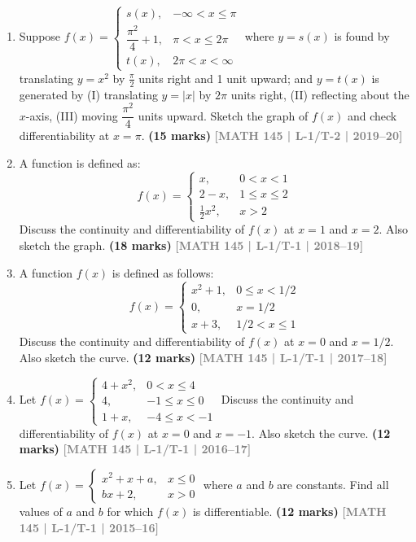 \documentclass[12pt,a4paper]{article}
\newcommand{\yr}[1]{\hfill\textcolor{gray}{\small\textbf{[#1]}}}
\newcommand{\mk}[1]{\textcolor{orange!70!black}{\small\textbf{(#1 marks)}}}
\begin{document}
\begin{enumerate}
\item Suppose $f(x)=\begin{cases}s(x), & -\infty<x\le\pi\\ \dfrac{\pi^{2}}{4}+1, & \pi<x\le 2\pi\\ t(x), & 2\pi<x<\infty\end{cases}$ where $y=s(x)$ is found by translating $y=x^{2}$ by $\frac{\pi}{2}$ units right and 1 unit upward; and $y=t(x)$ is generated by (I) translating $y=|x|$ by $2\pi$ units right, (II) reflecting about the $x$-axis, (III) moving $\dfrac{\pi^{2}}{4}$ units upward. Sketch the graph of $f(x)$ and check differentiability at $x=\pi$.
\mk{15} \yr{MATH 145 | L-1/T-2 | 2019--20}

\item A function is defined as:
\[
f(x)=\begin{cases}x, & 0<x<1\\ 2-x, & 1\le x\le 2\\ \tfrac{1}{2}x^{2}, & x>2\end{cases}
\]
Discuss the continuity and differentiability of $f(x)$ at $x=1$ and $x=2$. Also sketch the graph.
\mk{18} \yr{MATH 145 | L-1/T-1 | 2018--19}

\item A function $f(x)$ is defined as follows:
\[
f(x)=\begin{cases}x^{2}+1, & 0\le x<1/2\\ 0, & x=1/2\\ x+3, & 1/2<x\le 1\end{cases}
\]
Discuss the continuity and differentiability of $f(x)$ at $x=0$ and $x=1/2$. Also sketch the curve.
\mk{12} \yr{MATH 145 | L-1/T-1 | 2017--18}

\item Let $f(x)=\begin{cases}4+x^{2}, & 0<x\le 4\\ 4, & -1\le x\le 0\\ 1+x, & -4\le x<-1\end{cases}$ Discuss the continuity and differentiability of $f(x)$ at $x=0$ and $x=-1$. Also sketch the curve.
\mk{12} \yr{MATH 145 | L-1/T-1 | 2016--17}

\item Let $f(x)=\begin{cases}x^{2}+x+a, & x\le 0\\ bx+2, & x>0\end{cases}$ where $a$ and $b$ are constants. Find all values of $a$ and $b$ for which $f(x)$ is differentiable.
\mk{12} \yr{MATH 145 | L-1/T-1 | 2015--16}


\end{enumerate}
\end{document}
